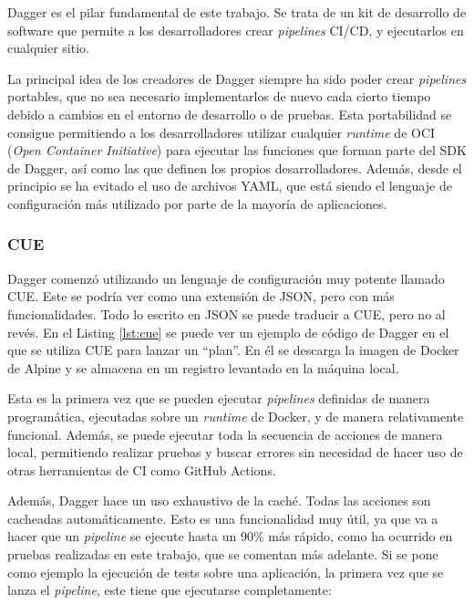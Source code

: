 Dagger es el pilar fundamental de este trabajo. Se trata de un kit de desarrollo de software que permite a los desarrolladores crear \textit{pipelines} CI/CD, y ejecutarlos en cualquier sitio.

La principal idea de los creadores de Dagger siempre ha sido poder crear \textit{pipelines} portables, que no sea necesario implementarlos de nuevo cada cierto tiempo debido a cambios en el entorno de desarrollo o de pruebas. Esta portabilidad se consigue permitiendo a los desarrolladores utilizar cualquier \textit{runtime} de OCI (\textit{Open Container Initiative}\cite{oci}) para ejecutar las funciones que forman parte del SDK\cite{sdk} de Dagger, así como las que definen los propios desarrolladores. Además, desde el principio se ha evitado el uso de archivos YAML, que está siendo el lenguaje de configuración más utilizado por parte de la mayoría de aplicaciones.

\subsubsection*{CUE}
\label{subsec:cue}

Dagger comenzó utilizando un lenguaje de configuración muy potente llamado CUE\cite{cue}. Este se podría ver como una extensión de JSON, pero con más funcionalidades. Todo lo escrito en JSON se puede traducir a CUE, pero no al revés. En el Listing \ref{lst:cue} se puede ver un ejemplo de código de Dagger en el que se utiliza CUE para lanzar un ``plan''. En él se descarga la imagen de Docker de Alpine y se almacena en un registro levantado en la máquina local.

Esta es la primera vez que se pueden ejecutar \textit{pipelines} definidas de manera programática, ejecutadas sobre un \textit{runtime} de Docker, y de manera relativamente funcional. Además, se puede ejecutar toda la secuencia de acciones de manera local, permitiendo realizar pruebas y buscar errores sin necesidad de hacer uso de otras herramientas de CI como GitHub Actions.

Además, Dagger hace un uso exhaustivo de la caché. Todas las acciones son cacheadas automáticamente. Esto es una funcionalidad muy útil, ya que va a hacer que un \textit{pipeline} se ejecute hasta un 90\% más rápido, como ha ocurrido en pruebas realizadas en este trabajo, que se comentan más adelante. Si se pone como ejemplo la ejecución de tests sobre una aplicación, la primera vez que se lanza el \textit{pipeline}, este tiene que ejecutarse completamente:

